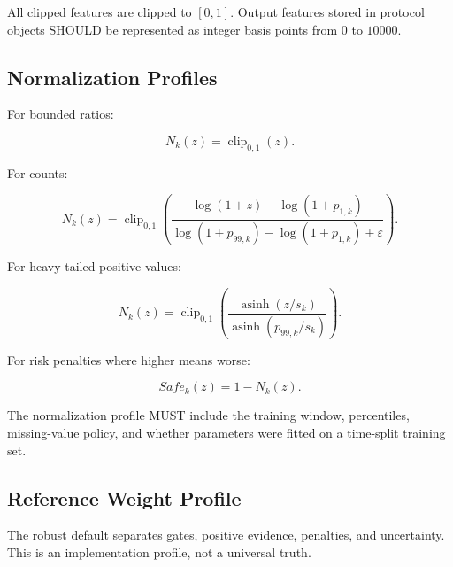 \documentclass[11pt]{article}
\begin{document}
All clipped features are clipped to \([0,1]\). Output features stored in protocol objects SHOULD be represented as integer basis points from \(0\) to \(10000\).

\subsection{Normalization Profiles}

For bounded ratios:

\begin{equation}
N_k(z)=\operatorname{clip}_{0,1}(z).
\end{equation}

For counts:

\begin{equation}
N_k(z)=\operatorname{clip}_{0,1}\left(\frac{\log(1+z)-\log(1+p_{1,k})}{\log(1+p_{99,k})-\log(1+p_{1,k})+\varepsilon}\right).
\end{equation}

For heavy-tailed positive values:

\begin{equation}
N_k(z)=\operatorname{clip}_{0,1}\left(\frac{\operatorname{asinh}(z/s_k)}{\operatorname{asinh}(p_{99,k}/s_k)}\right).
\end{equation}

For risk penalties where higher means worse:

\begin{equation}
Safe_k(z)=1-N_k(z).
\end{equation}

The normalization profile MUST include the training window, percentiles, missing-value policy, and whether parameters were fitted on a time-split training set.

\subsection{Reference Weight Profile}

The robust default separates gates, positive evidence, penalties, and uncertainty. This is an implementation profile, not a universal truth.
\end{document}
